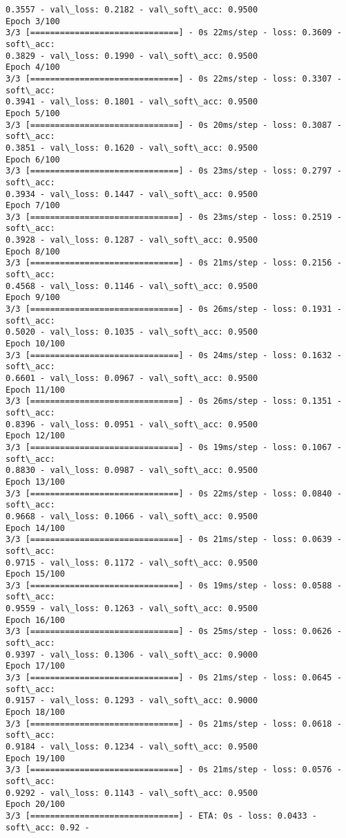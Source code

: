 \documentclass[11pt]{article}
\begin{document}
\begin{Verbatim}[commandchars=\\\{\}]
0.3557 - val\_loss: 0.2182 - val\_soft\_acc: 0.9500
Epoch 3/100
3/3 [==============================] - 0s 22ms/step - loss: 0.3609 - soft\_acc:
0.3829 - val\_loss: 0.1990 - val\_soft\_acc: 0.9500
Epoch 4/100
3/3 [==============================] - 0s 22ms/step - loss: 0.3307 - soft\_acc:
0.3941 - val\_loss: 0.1801 - val\_soft\_acc: 0.9500
Epoch 5/100
3/3 [==============================] - 0s 20ms/step - loss: 0.3087 - soft\_acc:
0.3851 - val\_loss: 0.1620 - val\_soft\_acc: 0.9500
Epoch 6/100
3/3 [==============================] - 0s 23ms/step - loss: 0.2797 - soft\_acc:
0.3934 - val\_loss: 0.1447 - val\_soft\_acc: 0.9500
Epoch 7/100
3/3 [==============================] - 0s 23ms/step - loss: 0.2519 - soft\_acc:
0.3928 - val\_loss: 0.1287 - val\_soft\_acc: 0.9500
Epoch 8/100
3/3 [==============================] - 0s 21ms/step - loss: 0.2156 - soft\_acc:
0.4568 - val\_loss: 0.1146 - val\_soft\_acc: 0.9500
Epoch 9/100
3/3 [==============================] - 0s 26ms/step - loss: 0.1931 - soft\_acc:
0.5020 - val\_loss: 0.1035 - val\_soft\_acc: 0.9500
Epoch 10/100
3/3 [==============================] - 0s 24ms/step - loss: 0.1632 - soft\_acc:
0.6601 - val\_loss: 0.0967 - val\_soft\_acc: 0.9500
Epoch 11/100
3/3 [==============================] - 0s 26ms/step - loss: 0.1351 - soft\_acc:
0.8396 - val\_loss: 0.0951 - val\_soft\_acc: 0.9500
Epoch 12/100
3/3 [==============================] - 0s 19ms/step - loss: 0.1067 - soft\_acc:
0.8830 - val\_loss: 0.0987 - val\_soft\_acc: 0.9500
Epoch 13/100
3/3 [==============================] - 0s 22ms/step - loss: 0.0840 - soft\_acc:
0.9668 - val\_loss: 0.1066 - val\_soft\_acc: 0.9500
Epoch 14/100
3/3 [==============================] - 0s 21ms/step - loss: 0.0639 - soft\_acc:
0.9715 - val\_loss: 0.1172 - val\_soft\_acc: 0.9500
Epoch 15/100
3/3 [==============================] - 0s 19ms/step - loss: 0.0588 - soft\_acc:
0.9559 - val\_loss: 0.1263 - val\_soft\_acc: 0.9500
Epoch 16/100
3/3 [==============================] - 0s 25ms/step - loss: 0.0626 - soft\_acc:
0.9397 - val\_loss: 0.1306 - val\_soft\_acc: 0.9000
Epoch 17/100
3/3 [==============================] - 0s 21ms/step - loss: 0.0645 - soft\_acc:
0.9157 - val\_loss: 0.1293 - val\_soft\_acc: 0.9000
Epoch 18/100
3/3 [==============================] - 0s 21ms/step - loss: 0.0618 - soft\_acc:
0.9184 - val\_loss: 0.1234 - val\_soft\_acc: 0.9500
Epoch 19/100
3/3 [==============================] - 0s 21ms/step - loss: 0.0576 - soft\_acc:
0.9292 - val\_loss: 0.1143 - val\_soft\_acc: 0.9500
Epoch 20/100
3/3 [==============================] - ETA: 0s - loss: 0.0433 - soft\_acc: 0.92 -

\end{Verbatim}
\end{document}
